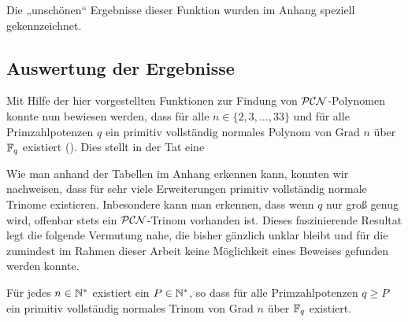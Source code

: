 Die „unschönen“ Ergebnisse dieser Funktion wurden im Anhang speziell
gekennzeichnet.


\subsection{Auswertung der Ergebnisse}

Mit Hilfe der hier vorgestellten Funktionen zur Findung von $\mathcal{PCN}$-Polynomen
konnte nun bewiesen werden, dass für alle $n \in \{ 2,3,\ldots,33\}$ und für
alle Primzahlpotenzen $q$ ein primitiv vollständig normales Polynom von Grad
$n$ über $\mathbb{F}_q$ existiert (). Dies stellt in der Tat
eine 


Wie man anhand der Tabellen im Anhang erkennen kann, konnten wir nachweisen,
dass für sehr viele Erweiterungen primitiv vollständig normale Trinome
existieren. Inbesondere kann man erkennen, dass wenn $q$ nur groß genug wird,
offenbar stets ein $\mathcal{PCN}$-Trinom vorhanden ist. Dieses faszinierende Resultat 
legt die folgende Vermutung nahe, die bisher gänzlich unklar bleibt und für die 
zumindest im Rahmen dieser Arbeit keine Möglichkeit eines 
Beweises gefunden werden konnte.

\begin{vermutung}
  Für jedes $n\in \mathbb{N}^\ast$ existiert ein $P\in \mathbb{N}^\ast$, so dass für alle
  Primzahlpotenzen $q \geq P$ ein primitiv vollständig normales Trinom von Grad
  $n$ über $\mathbb{F}_q$ existiert.
\end{vermutung}
